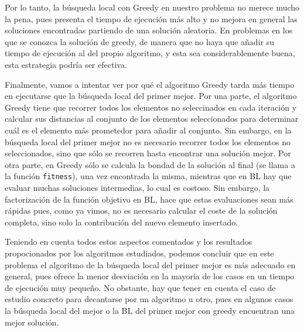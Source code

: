 \documentclass[11pt,a4paper]{article}
\begin{document}
	 Por lo tanto, la búsqueda local con Greedy en nuestro problema no merece mucho la pena, pues presenta el tiempo de ejecución más alto y no mejora en general las soluciones encontradas partiendo de una solución aleatoria. En problemas en los que se conozca la solución de greedy, de manera que no haya que añadir su tiempo de ejecución al del propio algoritmo, y esta sea considerablemente buena, esta estrategia podría ser efectiva. 
	 
	 Finalmente, vamos a intentar ver por qué el algoritmo Greedy tarda más tiempo en ejecutarse que la búsqueda local del primer mejor. Por una parte, el algoritmo Greedy tiene que recorrer todos los elementos no seleccinados en cada iteración y calcular sus distancias al conjunto de los elementos seleccionados para determinar cuál es el elemento más prometedor para añadir al conjunto. Sin embargo, en la búsqueda local del primer mejor no es necesario recorrer todos los elementos no seleccionados, sino que sólo se recorren hasta encontrar una solución mejor. Por otra parte, en Greedy sólo se calcula la bondad de la solución al final (se llama a la función \lstinline|fitness|), una vez encontrada la misma, mientras que en BL hay que evaluar muchas soluciones intermedias, lo cual es costoso. Sin embargo, la factorización de la función objetivo en BL, hace que estas evaluaciones sean más rápidas pues, como ya vimos, no es necesario calcular el coste de la solución completa, sino solo la contribución del nuevo elemento insertado. 
	 
	 Teniendo en cuenta todos estos aspectos comentados y los resultados propocionados por los algoritmos estudiados, podemos concluir que en este problema el algoritmo de la búsqueda local del primer mejor es más adecuado en general, pues ofrece la menor desviación  en la mayoría de los casos en un tiempo de ejecución muy pequeño. No obstante, hay que tener en cuenta el caso de estudio concreto para decantarse por un algoritmo u otro, pues en algunos casos la búsqueda local del mejor o la BL del primer mejor con greedy encuentran una mejor solución. 
	 
\end{document}
